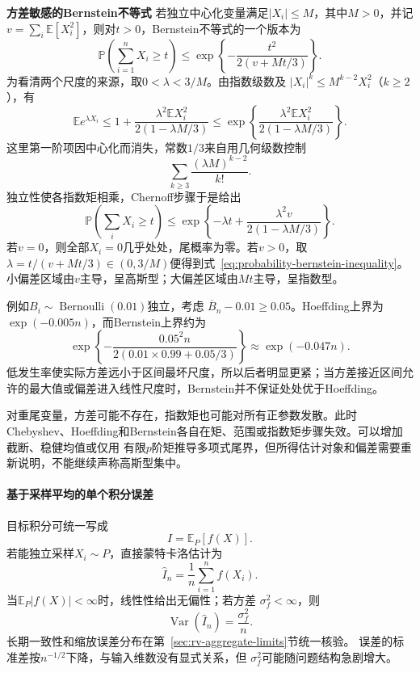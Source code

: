 \par\medskip\noindent\textbf{方差敏感的Bernstein不等式}\quad
若独立中心化变量满足\(|X_i|\leq M\)，其中\(M>0\)，并记\(v=\sum_i\mathbb{E}[X_i^2]\)，则对\(t>0\)，Bernstein不等式的一个版本为
\begin{equation}
  \mathbb{P}\left(\sum_{i=1}^{n}X_i\geq t\right)
  \leq
  \exp\left\{
    -\frac{t^2}{2(v+Mt/3)}
  \right\}.
  \label{eq:probability-bernstein-inequality}
\end{equation}
为看清两个尺度的来源，取\(0<\lambda<3/M\)。由指数级数及
\(|X_i|^k\leq M^{k-2}X_i^2\)（\(k\geq2\)），有
\[
  \mathbb{E}e^{\lambda X_i}
  \leq
  1+\frac{\lambda^2\mathbb{E}X_i^2}
           {2(1-\lambda M/3)}
  \leq
  \exp\left\{
    \frac{\lambda^2\mathbb{E}X_i^2}
         {2(1-\lambda M/3)}
  \right\}.
\]
这里第一阶项因中心化而消失，常数\(1/3\)来自用几何级数控制
\[
  \sum_{k\geq3}\frac{(\lambda M)^{k-2}}{k!}.
\]
独立性使各指数矩相乘，Chernoff步骤于是给出
\[
  \mathbb{P}\left(\sum_iX_i\geq t\right)
  \leq
  \exp\left\{
    -\lambda t+\frac{\lambda^2v}
      {2(1-\lambda M/3)}
  \right\}.
\]
若\(v=0\)，则全部\(X_i=0\)几乎处处，尾概率为零。若\(v>0\)，取\(\lambda=t/(v+Mt/3)\in(0,3/M)\)便得到式~\eqref{eq:probability-bernstein-inequality}。小偏差区域由\(v\)主导，呈高斯型；大偏差区域由\(Mt\)主导，呈指数型。

例如\(B_i\sim\operatorname{Bernoulli}(0.01)\)独立，考虑
\(\overline{B}_n-0.01\geq0.05\)。Hoeffding上界为
\(\exp(-0.005n)\)，而Bernstein上界约为
\[
  \exp\left\{
    -\frac{0.05^2n}
      {2(0.01\times0.99+0.05/3)}
  \right\}
  \approx \exp(-0.047n).
\]
低发生率使实际方差远小于区间最坏尺度，所以后者明显更紧；当方差接近区间允许的最大值或偏差进入线性尺度时，Bernstein并不保证处处优于Hoeffding。

对重尾变量，方差可能不存在，指数矩也可能对所有正参数发散。此时Chebyshev、Hoeffding和Bernstein各自在矩、范围或指数矩步骤失效。可以增加截断、稳健均值或仅用
有限\(p\)阶矩推导多项式尾界，但所得估计对象和偏差需要重新说明，不能继续声称高斯型集中。

\paragraph{基于采样平均的单个积分误差}
\label{sec:probability-monte-carlo-variance-reduction}
目标积分可统一写成
\[ I=\mathbb{E}_P[f(X)]. \]
若能独立采样\(X_i\sim P\)，直接蒙特卡洛估计为
\[ \widehat{I}_n
  =\frac{1}{n}\sum_{i=1}^{n}f(X_i). \]
当\(\mathbb E_P|f(X)|<\infty\)时，线性性给出无偏性；若方差
\(\sigma_f^2<\infty\)，则
\[ \operatorname{Var}(\widehat I_n)=\frac{\sigma_f^2}{n}. \]
长期一致性和缩放误差分布在第~\ref{sec:rv-aggregate-limits}节统一核验。
误差的标准差按\(n^{-1/2}\)下降，与输入维数没有显式关系，但
\(\sigma_f^2\)可能随问题结构急剧增大。


